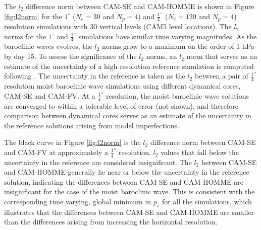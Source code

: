 \documentclass{agujournal}
\begin{document}
{The $l_2$ difference norm between CAM-SE and CAM-HOMME is shown in Figure \ref{fig:l2norm} for the $1^{\circ}$ ($N_e=30$ and $N_p=4$) and $\frac{1}{4}^{\circ}$ ($N_e=120$ and $N_p=4$) resolution simulations with 30 vertical levels (CAM5 level locations). The $l_2$ norms for the $1^{\circ}$ and $\frac{1}{4}^{\circ}$ simulations have similar time varying magnitudes. As the baroclinic waves evolves, the $l_2$ norms grow to a maximum on the order of 1 hPa by day 15. To assess the significance of the $l_2$ norms, an $l_2$ norm that serves as an estimate of the uncertainty of a high resolution reference simulation is computed following \cite{JW2006QJR}. The uncertainty in the reference is taken as the $l_2$ between a pair of $\frac{1}{4}^{\circ}$ resolution moist baroclinic wave simulations using different dynamical cores, CAM-SE and CAM-FV. At a $\frac{1}{4}^{\circ}$ resolution, the moist baroclinic wave solutions are converged to within a tolerable level of error (not shown), and therefore comparison between dynamical cores serves as an estimate of the uncertainty in the reference solutions arising from model imperfections. 

The black curve in Figure \ref{fig:l2norm} is the $l_2$ difference norm between CAM-SE and CAM-FV at approximately a $\frac{1}{4}^{\circ}$ resolution. $l_2$ values that fall below the uncertainty in the reference are considered insignificant. The $l_2$ between CAM-SE and CAM-HOMME generally lie near or below the uncertainty in the reference solution, indicating the differences between CAM-SE and CAM-HOMME are insignificant for the case of the moist baroclinic wave. This is consistent with the corresponding time varying, global minimum in $p_s$ for all the simulations, which illustrates that the differences between CAM-SE and CAM-HOMME are smaller than the differences arising from increasing the horizontal resolution.

}
\end{document}

